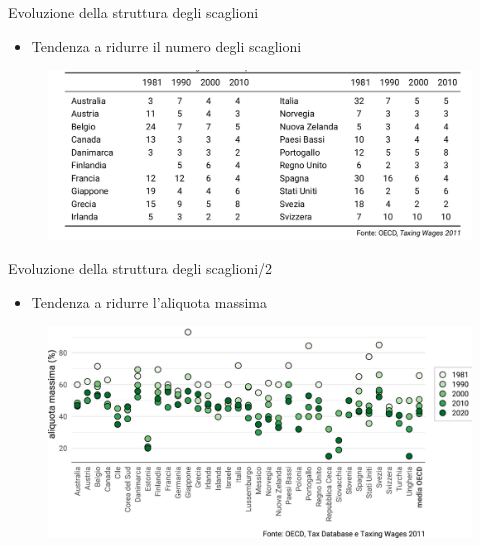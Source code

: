 \documentclass[aspectratio=64,12pt]{beamer}
\newcommand\€{\,\text{€}}
\begin{document}
\begin{frame}{Evoluzione della struttura degli scaglioni}
\begin{itemize}
\item Tendenza a ridurre il numero degli scaglioni
\end{itemize}

\begin{figure}
\centering
\includegraphics[width=\linewidth]{./figure/evoluzione-numero-scaglioni.png}
\end{figure}
\end{frame}


\begin{frame}{Evoluzione della struttura degli scaglioni/2}
\begin{itemize}
\item Tendenza a ridurre l'aliquota massima
\end{itemize}

\begin{figure}
\centering
\includegraphics[width=\linewidth]{./figure/top-rates-OCSE-color.pdf}
\end{figure}
\end{frame}
\end{document}
